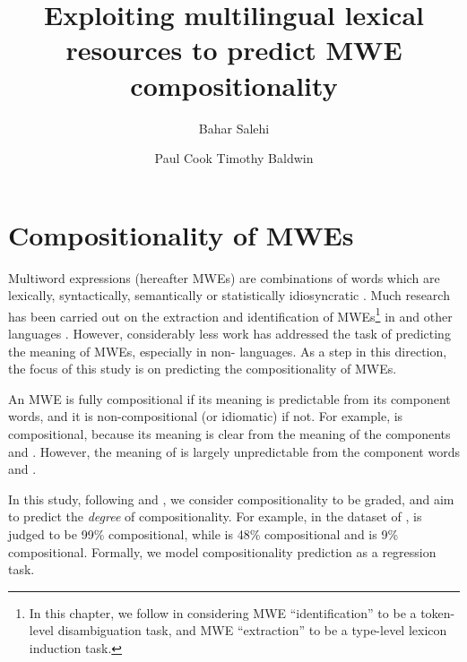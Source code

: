 \documentclass[output=paper,modfonts,nonflat]{langsci/langscibook}
\title{Exploiting multilingual lexical resources to predict MWE compositionality}
\author{Bahar Salehi\affiliation{The University of Melbourne}\and Paul Cook\affiliation{University of New Brunswick} \lastand Timothy Baldwin\affiliation{The University of Melbourne} }
\begin{document}
\maketitle
\label{SALEHI-CHAPTER}



\section{Compositionality of MWEs\label{salehi:sec:intro}}


Multiword expressions (hereafter MWEs) are combinations of words which
are lexically, syntactically, semantically or statistically
idiosyncratic \citep{Sag2002a,baldwin2010multiword}. Much research has
been carried out on the extraction and identification of
MWEs\footnote{In this chapter, we follow \citet{baldwin2010multiword} in
  considering MWE ``identification'' to be a token-level
  disambiguation task, and MWE ``extraction'' to be a type-level
  lexicon induction task.} in 
\citep{Schone2001,Pecina2008,fazly-cook-stevenson:2009:CL} and other languages
\citep{dias2003,evert2005,salehi2012}. However, considerably less work
has addressed the task of predicting the meaning of MWEs, especially
in non- languages. As a step in this direction, the focus of
this study is on predicting the compositionality of MWEs.

An MWE is fully compositional if its meaning is predictable from its
component words, and it is non-compositional (or idiomatic) if
not. For example,   is
compositional, because its meaning is clear from the meaning of the
components  and . However, the meaning of
  is largely unpredictable
from the component words  and .

In this study, following \citet{mccarthy2003} and
\citet{reddy2011a}, we consider compositionality to be graded, and aim
to predict the \textit{degree} of compositionality. For example, in the
dataset of \citet{reddy2011a},  is judged to be
99\% compositional, while  is 48\% compositional and
 is 9\% compositional. Formally, we model
compositionality prediction as a regression task.
\end{document}
